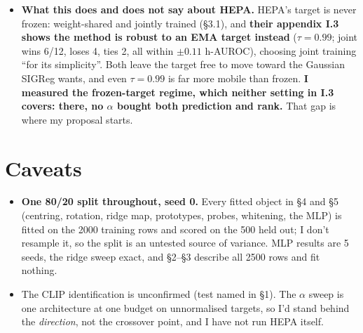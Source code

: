 \documentclass[8pt]{extarticle}
\newcommand{\hl}[1]{\textcolor{acc}{\textbf{#1}}}
\newcommand{\B}[1]{\textbf{#1}}
\begin{document}
\begin{itemize}
      $0.109{\pm}0.000$$\to$$0.048{\pm}0.003$ at $\alpha{=}0.01$; rank $129{\pm}1$$\to$$11.4{\pm}0.6$).
      What is left is the target being \B{frozen}.
\item \hl{What this does and does not say about HEPA.} HEPA's target is never frozen: weight-shared and jointly
      trained (\S3.1), and \B{their appendix I.3 shows the method is robust to an EMA target instead}
      ($\tau{=}0.99$; joint wins 6/12, loses 4, ties 2, all within $\pm0.11$ h-AUROC), choosing joint training
      ``for its simplicity''. Both leave the target free to move toward the Gaussian SIGReg wants, and even
      $\tau{=}0.99$ is far more mobile than frozen. \hl{I measured the frozen-target regime, which neither
      setting in I.3 covers: there, no $\alpha$ bought both prediction and rank.} That gap is where my proposal
      starts.
\end{itemize}

\section{Caveats}
\begin{itemize}
\item \B{One 80/20 split throughout, seed 0.} Every fitted object in \S4 and \S5 (centring, rotation, ridge map,
      prototypes, probes, whitening, the MLP) is fitted on the 2000 training rows and scored on the 500 held
      out; I don't resample it, so the split is an untested source of variance. MLP results are 5 seeds, the
      ridge sweep exact, and \S2--\S3 describe all 2500 rows and fit nothing.
\item The CLIP identification is unconfirmed (test named in \S1). The $\alpha$ sweep is one architecture at one
      budget on unnormalised targets, so I'd stand behind the \emph{direction}, not the crossover point, and I
      have not run HEPA itself.
\end{itemize}
\end{document}
